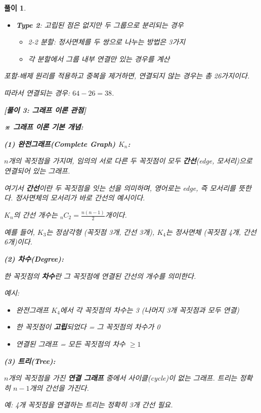\documentclass[12pt,a4paper]{article}
\theoremstyle{test_form}
\newtheorem*{solution}{풀이}
\begin{document}
\begin{solution}
\begin{itemize}
\item \textbf{Type 2}: 고립된 점은 없지만 두 그룹으로 분리되는 경우
  \begin{itemize}
  \item 2-2 분할: 정사면체를 두 쌍으로 나누는 방법은 3가지
  \item 각 분할에서 그룹 내부 연결만 있는 경우를 계산
  \end{itemize}
\end{itemize}

포함-배제 원리를 적용하고 중복을 제거하면, 연결되지 않는 경우는 총 26가지이다.

따라서 연결되는 경우: \(64 - 26 = 38\).

\vspace{0.5cm}

\textbf{[풀이 3: 그래프 이론 관점]}

\textbf{※ 그래프 이론 기본 개념:}

\textbf{(1) 완전그래프(Complete Graph) \(K_n\):}

\(n\)개의 꼭짓점을 가지며, 임의의 서로 다른 두 꼭짓점이 모두 \textbf{간선}(edge, 모서리)으로 연결되어 있는 그래프.

여기서 \textbf{간선}이란 두 꼭짓점을 잇는 선을 의미하며, 영어로는 edge, 즉 모서리를 뜻한다. 정사면체의 모서리가 바로 간선의 예시이다.

\(K_n\)의 간선 개수는 \(_nC_2 = \frac{n(n-1)}{2}\)개이다.

예를 들어, \(K_3\)는 정삼각형 (꼭짓점 3개, 간선 3개), \(K_4\)는 정사면체 (꼭짓점 4개, 간선 6개)이다.

\textbf{(2) 차수(Degree):}

한 꼭짓점의 \textbf{차수}란 그 꼭짓점에 연결된 간선의 개수를 의미한다.

예시:
\begin{itemize}
\item 완전그래프 \(K_4\)에서 각 꼭짓점의 차수는 3 (나머지 3개 꼭짓점과 모두 연결)
\item 한 꼭짓점이 \textbf{고립}되었다 = 그 꼭짓점의 차수가 0
\item 연결된 그래프 = 모든 꼭짓점의 차수 \(\geq 1\)
\end{itemize}

\textbf{(3) 트리(Tree):}

\(n\)개의 꼭짓점을 가진 \textbf{연결 그래프} 중에서 사이클(cycle)이 없는 그래프. 트리는 정확히 \(n-1\)개의 간선을 가진다.

예: 4개 꼭짓점을 연결하는 트리는 정확히 3개 간선 필요.

\vspace{0.3cm}


\end{solution}
\end{document}
